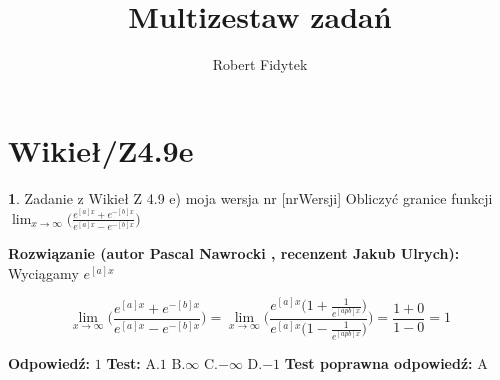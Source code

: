 \documentclass[12pt, a4paper]{article}
\title{Multizestaw zadań}
\author{Robert Fidytek}
\date{}
\theoremstyle{definition} %
\newtheorem{zad}{}
\newcommand{\kategoria}[1]{\section{#1}} %
\newcommand{\zadStart}[1]{\begin{zad}#1\newline} %
\newcommand{\zadStop}{\end{zad}}   %
\newcommand{\rozwStart}[2]{\noindent \textbf{Rozwiązanie (autor #1 , recenzent #2): }\newline} %
\newcommand{\odpStart}{\noindent \textbf{Odpowiedź:}\newline}    %
\newcommand{\odpStop}{\newline}                                             %
\newcommand{\testStart}{\noindent \textbf{Test:}\newline} %
\newcommand{\testStop}{\newline} %
\newcommand{\kluczStart}{\noindent \textbf{Test poprawna odpowiedź:}\newline} %
\newcommand{\kluczStop}{\newline} %
\begin{document}
\maketitle


\kategoria{Wikieł/Z4.9e}
\zadStart{Zadanie z Wikieł Z 4.9 e) moja wersja nr [nrWersji]}
Obliczyć granice funkcji $\displaystyle{\lim_{x \to \infty}}\bigg(\frac{e^{[a]x}+e^{-[b]x}}{e^{[a]x}-e^{-[b]x}}\bigg)$
\zadStop
\rozwStart{Pascal Nawrocki}{Jakub Ulrych}
Wyciągamy $e^{[a]x}$

$$\displaystyle{\lim_{x \to \infty}}\bigg(\frac{e^{[a]x}+e^{-[b]x}}{e^{[a]x}-e^{-[b]x}}\bigg)=\displaystyle{\lim_{x \to \infty}}\bigg(\frac{e^{[a]x}\big(1+\frac{1}{e^{[apb]x}}\big)}{e^{[a]x}\big(1-\frac{1}{e^{[apb]x}}\big)}\bigg)=\frac{1+0}{1-0}=1$$

\odpStart
$1$
\odpStop
\testStart
A.$1$
B.$\infty$
C.$-\infty$
D.$-1$
\testStop
\kluczStart
A
\kluczStop
\end{document}
